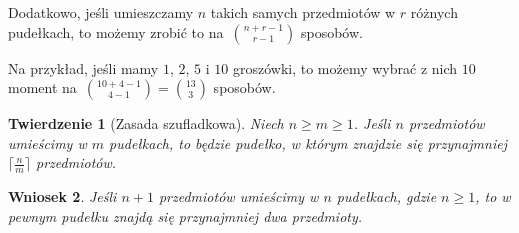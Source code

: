 \documentclass[12pt]{article}
\newtheorem{thm}{Twierdzenie}
\newtheorem{crl}[thm]{Wniosek}
\begin{document}
Dodatkowo, jeśli umieszczamy $n$ takich samych przedmiotów
w $r$ różnych pudełkach, to możemy zrobić to
na~$\binom{n+r-1}{r-1}$ sposobów.

Na przykład, jeśli mamy $1$, $2$, $5$ i $10$ groszówki, 
to możemy wybrać z nich $10$ moment 
na~$\binom{10+4-1}{4-1}=\binom{13}{3}$
sposobów.

\begin{thm}[Zasada szufladkowa]
	Niech $n\geq m\geq 1$. Jeśli $n$ przedmiotów umieścimy w 
	$m$ pudełkach, to będzie pudełko, w którym znajdzie się
	przynajmniej $\lceil \frac{n}{m}\rceil$ przedmiotów.
\end{thm}

\begin{crl}
	Jeśli $n+1$ przedmiotów umieścimy w $n$ pudełkach, gdzie $n\geq 1$, 
	to w pewnym pudełku znajdą się przynajmniej dwa przedmioty.
\end{crl}
\end{document}
